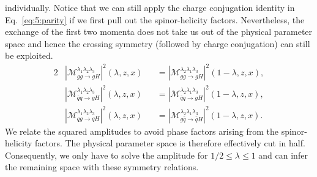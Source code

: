 individually. Notice that we can still apply the charge conjugation identity in Eq.~\eqref{eq:5:parity} if we first pull out the spinor-helicity factors. Nevertheless, the exchange of the first two momenta does not take us out of the physical parameter space and hence the crossing symmetry (followed by charge conjugation) can still be exploited.
\begin{alignat}{2}
& |\mathcal{M}_{gg \rightarrow g H}^{\lambda_1 \lambda_2 \lambda_3} |^2(\lambda, z, x) &&= |\mathcal{M}_{gg \rightarrow g H}^{\lambda_2 \lambda_1 \lambda_3}|^2 (1 - \lambda, z, x), \\
& |\mathcal{M}_{\bar{q}q \rightarrow g H}^{\lambda_1 \lambda_2 \lambda_3}|^2 (\lambda , z, x) &&= |\mathcal{M}_{\bar{q} q \rightarrow g H}^{\lambda_2 \lambda_1 \lambda_3}|^2 (1 - \lambda , z, x), \\
& |\mathcal{M}_{qg \rightarrow qH}^{\lambda_1 \lambda_2 \lambda_3}|^2 (\lambda, z, x) &&= |\mathcal{M}_{g \bar{q} \rightarrow \bar{q} H}^{\lambda_2 \lambda_1 \lambda_3}|^2 (1 - \lambda, z, x).
\end{alignat}
We relate the squared amplitudes to avoid phase factors arising from the spinor-helicity factors. The physical parameter space is therefore effectively cut in half. Consequently, we only have to solve the amplitude for $1/2 \le \lambda \le 1$ and can infer the remaining space with these symmetry relations.

